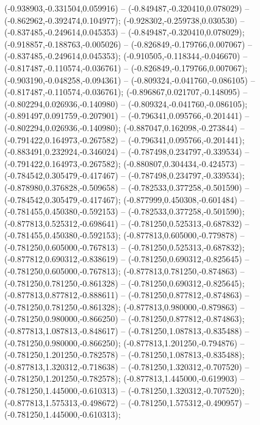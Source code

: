  (-0.938903,-0.331504,0.059916) -- (-0.849487,-0.320410,0.078029) -- (-0.862962,-0.392474,0.104977);
 (-0.928302,-0.259738,0.030530) -- (-0.837485,-0.249614,0.045353) -- (-0.849487,-0.320410,0.078029);
 (-0.918857,-0.188763,-0.005026) -- (-0.826849,-0.179766,0.007067) -- (-0.837485,-0.249614,0.045353);
 (-0.910505,-0.118344,-0.046670) -- (-0.817487,-0.110574,-0.036761) -- (-0.826849,-0.179766,0.007067);
 (-0.903190,-0.048258,-0.094361) -- (-0.809324,-0.041760,-0.086105) -- (-0.817487,-0.110574,-0.036761);
 (-0.896867,0.021707,-0.148095) -- (-0.802294,0.026936,-0.140980) -- (-0.809324,-0.041760,-0.086105);
 (-0.891497,0.091759,-0.207901) -- (-0.796341,0.095766,-0.201441) -- (-0.802294,0.026936,-0.140980);
 (-0.887047,0.162098,-0.273844) -- (-0.791422,0.164973,-0.267582) -- (-0.796341,0.095766,-0.201441);
 (-0.883491,0.232924,-0.346024) -- (-0.787498,0.234797,-0.339534) -- (-0.791422,0.164973,-0.267582);
 (-0.880807,0.304434,-0.424573) -- (-0.784542,0.305479,-0.417467) -- (-0.787498,0.234797,-0.339534);
 (-0.878980,0.376828,-0.509658) -- (-0.782533,0.377258,-0.501590) -- (-0.784542,0.305479,-0.417467);
 (-0.877999,0.450308,-0.601484) -- (-0.781455,0.450380,-0.592153) -- (-0.782533,0.377258,-0.501590);
 (-0.877813,0.525312,-0.698641) -- (-0.781250,0.525313,-0.687832) -- (-0.781455,0.450380,-0.592153);
 (-0.877813,0.605000,-0.779878) -- (-0.781250,0.605000,-0.767813) -- (-0.781250,0.525313,-0.687832);
 (-0.877812,0.690312,-0.838619) -- (-0.781250,0.690312,-0.825645) -- (-0.781250,0.605000,-0.767813);
 (-0.877813,0.781250,-0.874863) -- (-0.781250,0.781250,-0.861328) -- (-0.781250,0.690312,-0.825645);
 (-0.877813,0.877812,-0.888611) -- (-0.781250,0.877812,-0.874863) -- (-0.781250,0.781250,-0.861328);
 (-0.877813,0.980000,-0.879863) -- (-0.781250,0.980000,-0.866250) -- (-0.781250,0.877812,-0.874863);
 (-0.877813,1.087813,-0.848617) -- (-0.781250,1.087813,-0.835488) -- (-0.781250,0.980000,-0.866250);
 (-0.877813,1.201250,-0.794876) -- (-0.781250,1.201250,-0.782578) -- (-0.781250,1.087813,-0.835488);
 (-0.877813,1.320312,-0.718638) -- (-0.781250,1.320312,-0.707520) -- (-0.781250,1.201250,-0.782578);
 (-0.877813,1.445000,-0.619903) -- (-0.781250,1.445000,-0.610313) -- (-0.781250,1.320312,-0.707520);
 (-0.877813,1.575313,-0.498672) -- (-0.781250,1.575312,-0.490957) -- (-0.781250,1.445000,-0.610313);
